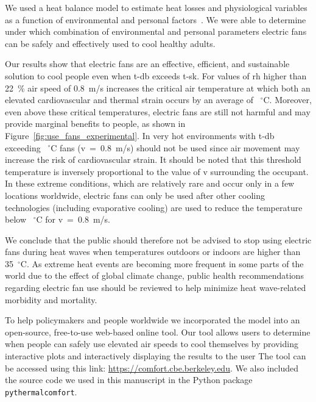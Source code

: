 We used a heat balance model to estimate heat losses and physiological variables as a function of environmental and personal factors~\cite{Gagge1986}.
We were able to determine under which combination of environmental and personal parameters electric fans can be safely and effectively used to cool healthy adults.

Our results show that electric fans are an effective, efficient, and sustainable solution to cool people even when \ac{t-db} exceeds \ac{t-sk}.
For values of \ac{rh} higher than 22~\% air speed of 0.8~m/s increases the critical air temperature at which both an elevated cardiovascular and thermal strain occurs by an average of ~$^{\circ}$C\@.
Moreover, even above these critical temperatures, electric fans are still not harmful and may provide marginal benefits to people, as shown in Figure~\ref{fig:use_fans_experimental}.
In very hot environments with \ac{t-db} exceeding ~$^{\circ}$C fans (\acf{v}~=~0.8~m/s) should not be used since air movement may increase the risk of cardiovascular strain.
It should be noted that this threshold temperature is inversely proportional to the value of \ac{v} surrounding the occupant.
In these extreme conditions, which are relatively rare and occur only in a few locations worldwide, electric fans can only be used after other cooling technologies (including evaporative cooling) are used to reduce the temperature below ~$^{\circ}$C for \ac{v}~=~0.8~m/s.

We conclude that the public should therefore not be advised to stop using electric fans during heat waves when temperatures outdoors or indoors are higher than 35~$^{\circ}$C\@.
As extreme heat events are becoming more frequent in some parts of the world due to the effect of global climate change, public health recommendations regarding electric fan use should be reviewed to help minimize heat wave-related morbidity and mortality.

To help policymakers and people worldwide we incorporated the model into an open-source, free-to-use web-based online tool.
Our tool allows users to determine when people can safely use elevated air speeds to cool themselves by providing interactive plots and interactively displaying the results to the user
The tool can be accessed using this link: \url{https://comfort.cbe.berkeley.edu}.
We also included the source code we used in this manuscript in the Python package \verb|pythermalcomfort|.

